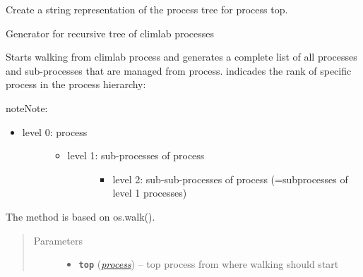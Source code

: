 \documentclass[letterpaper,10pt,english]{sphinxmanual}
\begin{document}
\begin{fulllineitems}
\label{api/climlab.utils:climlab.utils.walk.process_tree}
Create a string representation of the process tree for process top.

\end{fulllineitems}


\begin{fulllineitems}
\label{api/climlab.utils:climlab.utils.walk.walk_processes}
Generator for recursive tree of climlab processes

Starts walking from climlab process  and generates a complete 
list of all processes and sub-processes that are managed from  process.
 indicades the rank of specific process in the process hierarchy:

\begin{notice}{note}{Note:}\begin{itemize}
\item {} \begin{description}
\item[{level 0:  process}] \leavevmode\begin{itemize}
\item {} \begin{description}
\item[{level 1: sub-processes of  process}] \leavevmode\begin{itemize}
\item {} 
level 2: sub-sub-processes of  process (=subprocesses of level 1 processes)

\end{itemize}

\end{description}

\end{itemize}

\end{description}

\end{itemize}
\end{notice}

The method is based on os.walk().
\begin{quote}\begin{description}
\item[{Parameters}] \leavevmode\begin{itemize}
\item {} 
\textbf{\texttt{top}} ({\hyperref[api/climlab.process:module-climlab.process.process]{\emph{\emph{process}}}}) -- top process from where walking should start


\end{itemize}
\end{description}
\end{quote}
\end{fulllineitems}
\end{document}
